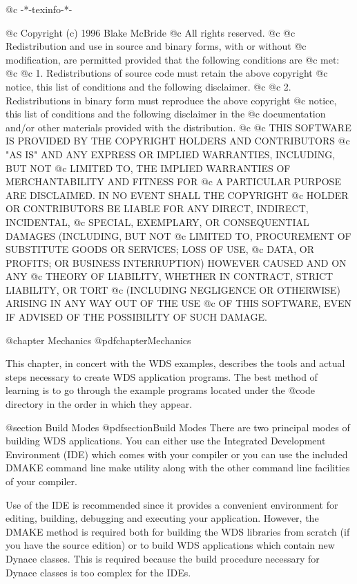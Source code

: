 @c -*-texinfo-*-

@c  Copyright (c) 1996 Blake McBride
@c  All rights reserved.
@c
@c  Redistribution and use in source and binary forms, with or without
@c  modification, are permitted provided that the following conditions are
@c  met:
@c
@c  1. Redistributions of source code must retain the above copyright
@c  notice, this list of conditions and the following disclaimer.
@c
@c  2. Redistributions in binary form must reproduce the above copyright
@c  notice, this list of conditions and the following disclaimer in the
@c  documentation and/or other materials provided with the distribution.
@c
@c  THIS SOFTWARE IS PROVIDED BY THE COPYRIGHT HOLDERS AND CONTRIBUTORS
@c  "AS IS" AND ANY EXPRESS OR IMPLIED WARRANTIES, INCLUDING, BUT NOT
@c  LIMITED TO, THE IMPLIED WARRANTIES OF MERCHANTABILITY AND FITNESS FOR
@c  A PARTICULAR PURPOSE ARE DISCLAIMED. IN NO EVENT SHALL THE COPYRIGHT
@c  HOLDER OR CONTRIBUTORS BE LIABLE FOR ANY DIRECT, INDIRECT, INCIDENTAL,
@c  SPECIAL, EXEMPLARY, OR CONSEQUENTIAL DAMAGES (INCLUDING, BUT NOT
@c  LIMITED TO, PROCUREMENT OF SUBSTITUTE GOODS OR SERVICES; LOSS OF USE,
@c  DATA, OR PROFITS; OR BUSINESS INTERRUPTION) HOWEVER CAUSED AND ON ANY
@c  THEORY OF LIABILITY, WHETHER IN CONTRACT, STRICT LIABILITY, OR TORT
@c  (INCLUDING NEGLIGENCE OR OTHERWISE) ARISING IN ANY WAY OUT OF THE USE
@c  OF THIS SOFTWARE, EVEN IF ADVISED OF THE POSSIBILITY OF SUCH DAMAGE.

@chapter Mechanics
@pdfchapter{Mechanics}

This chapter, in concert with the WDS examples, describes the tools and
actual steps necessary to create WDS application programs.  The best
method of learning is to go through the example programs located under
the @code{\DYNACE\WINEXAM} directory in the order in which they appear.

@section Build Modes
@pdfsection{Build Modes}
There are two principal modes of building WDS applications.  You can
either use the Integrated Development Environment (IDE) which comes
with your compiler or you can use the included DMAKE command line
make utility along with the other command line facilities of your
compiler.

Use of the IDE is recommended since it provides a convenient environment
for editing, building, debugging and executing your application.  However,
the DMAKE method is required both for building the WDS libraries from
scratch (if you have the source edition) or to build WDS applications
which contain new Dynace classes.  This is required because the build
procedure necessary for Dynace classes is too complex for the IDEs.

